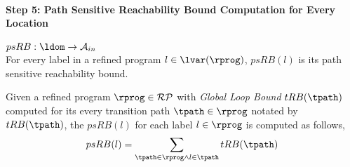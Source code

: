 \paragraph{Step 5: Path Sensitive Reachability Bound Computation for Every Location}
$psRB : \ldom \to \mathcal{A}_{in}$
\\
For every label in a refined program $l \in \lvar(\rprog)$,
 $psRB(l)$ is its path sensitive reachability bound.
 \\
 \begin{defn}
  \label{def:label_psrb}
Given a refined program $\rprog \in \mathcal{RP}$ with 
\emph{Global Loop Bound} $tRB(\tpath)$
computed for its every transition path $\tpath \in \rprog$  notated by $tRB(\tpath)$,
the $psRB(l)$ for each label $l \in \rprog$ is computed as follows,
\\
\[ psRB(l) = \sum\limits_{\tpath \in \rprog \land 
l \in \tpath} tRB(\tpath)\]
 \end{defn}